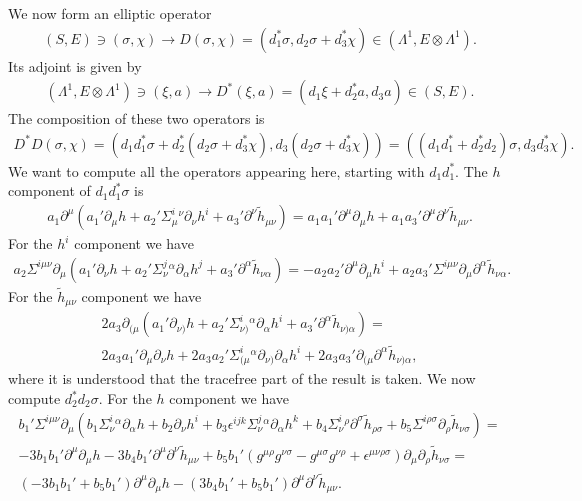 \documentclass[10pt]{report}
\theoremstyle{definition}
\begin{document}
We now form an elliptic operator
\begin{align}\label{D}
(S,E)\ni (\sigma,\chi) \to D(\sigma,\chi) = (d_1^*\sigma, d_2 \sigma + d_3^*\chi)\in (\Lambda^1,E\otimes\Lambda^1).
\end{align}
Its adjoint is given by 
\begin{align}\label{D*}
(\Lambda^1,E\otimes\Lambda^1) \ni (\xi,a) \to D^*(\xi,a) = ( d_1\xi + d_2^* a, d_3 a) \in (S,E).
\end{align}
The composition of these two operators is
\begin{align}
D^* D (\sigma,\chi) = ( d_1 d_1^*\sigma + d_2^* (d_2 \sigma + d_3^*\chi), d_3 (d_2 \sigma + d_3^*\chi))=( (d_1 d_1^* +d_2^* d_2 ) \sigma, d_3  d_3^*\chi).
\end{align}
We want to compute all the operators appearing here, starting with $d_1 d_1^*$. The $h$ component of $d_1 d_1^*\sigma$ is
\begin{align}
 a_1 \partial^\mu (a_1' \partial_\mu h + a_2' \Sigma^i_\mu{}^\nu \partial_\nu h^i + a_3' \partial^\nu \tilde{h}_{\mu\nu})= a_1 a_1' \partial^\mu \partial_\mu h + a_1 a_3' \partial^\mu \partial^\nu \tilde{h}_{\mu\nu}.
 \end{align}
 For the $h^i$ component we have
 \begin{align}
 a_2 \Sigma^{i\mu\nu} \partial_\mu (a_1' \partial_\nu h + a_2' \Sigma^j_\nu{}^\alpha \partial_\alpha h^j + a_3' \partial^\alpha \tilde{h}_{\nu\alpha})=
 - a_2 a_2' \partial^\mu \partial_\mu h^i+ a_2 a_3' \Sigma^{i\mu\nu} \partial_\mu \partial^\alpha \tilde{h}_{\nu\alpha}.
 \end{align}
 For the $\tilde{h}_{\mu\nu}$ component we have
 \begin{align}
 2 a_3 \partial_{(\mu} (a_1' \partial_{\nu)} h + a_2' \Sigma^i_{\nu)}{}^\alpha \partial_\alpha h^i + a_3' \partial^\alpha \tilde{h}_{\nu)\alpha})=\\ \nonumber
 2a_3 a_1'  \partial_{\mu} \partial_{\nu} h + 2a_3 a_2'  \Sigma^i_{(\mu}{}^\alpha \partial_{\nu)} \partial_\alpha h^i + 2 a_3 a_3' \partial_{(\mu}\partial^\alpha \tilde{h}_{\nu)\alpha},
 \end{align}
 where it is understood that the tracefree part of the result is taken. 
 We now compute $d_2^* d_2  \sigma$. For the $h$ component we have
 \begin{align}
  b_1' \Sigma^{i\mu\nu} \partial_\mu (b_1 \Sigma^i_\nu{}^\alpha \partial_\alpha h + b_2 \partial_\nu h^i + b_3 \epsilon^{ijk} \Sigma^j_\nu{}^\alpha \partial_\alpha h^k + b_4 \Sigma^i_\nu{}^\rho \partial^\sigma \tilde{h}_{\rho\sigma} + b_5 \Sigma^{i\rho\sigma}  \partial_\rho \tilde{h}_{\nu\sigma})= \\ \nonumber
  - 3 b_1 b_1' \partial^\mu \partial_\mu h - 3 b_4 b_1' \partial^\mu \partial^\nu \tilde{h}_{\mu\nu} + b_5 b_1' ( g^{\mu\rho} g^{\nu\sigma}- g^{\mu\sigma} g^{\nu\rho} + \epsilon^{\mu\nu\rho\sigma})
  \partial_\mu \partial_\rho \tilde{h}_{\nu\sigma} = \\ \nonumber
  ( - 3 b_1 b_1' + b_5 b_1' ) \partial^\mu \partial_\mu h - (3 b_4 b_1'  + b_5 b_1' )\partial^\mu \partial^\nu \tilde{h}_{\mu\nu}.
  \end{align}
\end{document}
